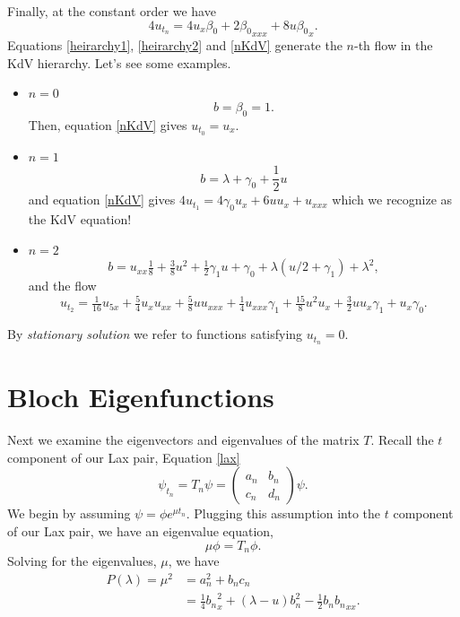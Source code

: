 \documentclass[12pt, a4paper]{article}
\begin{document}
Finally, at the constant order we have
\begin{equation} \label{nKdV}
  4 u_{t_n} = 4 u_x \beta_0 + 2{\beta_0}_{xxx} + 8
  u{\beta_0}_x.
\end{equation}
Equations \eqref{heirarchy1}, \eqref{heirarchy2} and \eqref{nKdV}
generate the $n$-th flow in the KdV hierarchy.  Let's see some examples.
\begin{itemize}
  \item $n=0$
    \[
      b = \beta_0 = 1.
    \]
    Then, equation \eqref{nKdV} gives $u_{t_0}=u_x$.

  \item $n=1$
    \[
      b = \lambda + \gamma_0 + \frac{1}{2}u
    \]
    and equation \eqref{nKdV} gives $4 u_{t_1} = 4 \gamma_0 u_x + 6uu_x
    + u_{xxx}$ which we recognize as the KdV equation!

  \item $n = 2$
    \[
      b = u_{xx} \tfrac{1}{8} + \tfrac{3}{8} u^2 +
          \tfrac{1}{2} \gamma_1 u + \gamma_0 +
          \lambda(u/2 + \gamma_1) + \lambda^2,
    \]
    and the flow
    \[
      u_{t_2} = \tfrac{1}{16} u_{5x} + \tfrac{5}{4}u_x u_{xx} +
                \tfrac{5}{8} u u_{xxx} + \tfrac{1}{4} u_{xxx} \gamma_1 +
                \tfrac{15}{8} u^2 u_x + \tfrac{3}{2} u u_x \gamma_1 +
                u_x\gamma_0.
    \]
\end{itemize}

By \emph{stationary solution} we refer to functions satisfying $u_{t_n}
= 0$.



\section{Bloch Eigenfunctions} \label{sec: bloch}



Next we examine the eigenvectors and eigenvalues of the matrix
$T$. Recall the $t$ component of our Lax pair, Equation \eqref{lax}
\[
  \psi_{t_n} = T_n \psi = \left(
               \begin{array}{cc}
                 a_n & b_n \\ c_n & d_n
               \end{array} \right)
               \psi.
\]
We begin by assuming $\psi = \phi e^{\mu t_n}$.  Plugging this
assumption into the $t$ component of our Lax pair, we have an eigenvalue
equation,
\begin{equation} \label{eval}
  \mu \phi = T_n \phi.
\end{equation}
Solving for the eigenvalues, $\mu$, we have
\begin{equation} \label{poly}
  \begin{split}
    P(\lambda) = \mu^2 &= a_n^2 + b_n c_n \\
    & = \tfrac{1}{4}{b_n}_x^2 +
        (\lambda - u) b_n^2 - \tfrac{1}{2} b_n {b_n}_{xx}.
  \end{split}
\end{equation}
\end{document}
